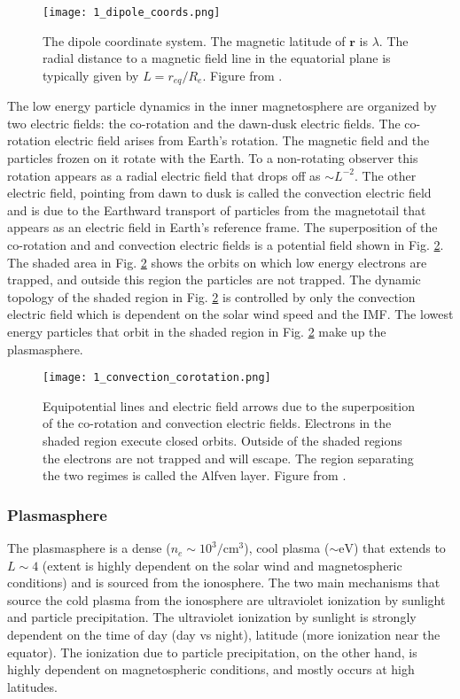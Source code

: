 \begin{figure}
\texttt{[image: 1\_dipole\_coords.png]}
\caption{The dipole coordinate system. The magnetic latitude of $\mathbf{r}$ is $\lambda$. The radial distance to a magnetic field line in the equatorial plane is typically given by $L = r_{eq}/R_e$. Figure from \citet{Baumjohann1997}.}
\label{Intro:dipole_coords}
\end{figure}


The low energy particle dynamics in the inner magnetosphere are organized by two electric fields: the co-rotation and the dawn-dusk electric fields. The co-rotation electric field arises from Earth's rotation. The magnetic field and the particles frozen on it rotate with the Earth. To a non-rotating observer this rotation appears as a radial electric field that drops off as $\sim L^{-2}$. The other electric field, pointing from dawn to dusk is called the convection electric field and is due to the Earthward transport of particles from the magnetotail that appears as an electric field in Earth's reference frame. The superposition of the co-rotation and and convection electric fields is a potential field shown in Fig. \ref{Intro:E_fields}. The shaded area in Fig. \ref{Intro:E_fields} shows the orbits on which low energy electrons are trapped, and outside this region the particles are not trapped. The dynamic topology of the shaded region in Fig. \ref{Intro:E_fields} is controlled by only the convection electric field which is dependent on the solar wind speed and the IMF. The lowest energy particles that orbit in the shaded region in Fig. \ref{Intro:E_fields} make up the plasmasphere.

\begin{figure}
\texttt{[image: 1\_convection\_corotation.png]}
\caption{Equipotential lines and electric field arrows due to the superposition of the co-rotation and convection electric fields. Electrons in the shaded region execute closed orbits. Outside of the shaded regions the electrons are not trapped and will escape. The region separating the two regimes is called the Alfven layer. Figure from \citet{Baumjohann1997}.}
\label{Intro:E_fields}
\end{figure}

\subsubsection{Plasmasphere}
The plasmasphere is a dense ($n_e \sim 10^3/\mathrm{cm}^3$), cool plasma ($\sim \mathrm{eV}$) that extends to $L \sim 4$ (extent is highly dependent on the solar wind and magnetospheric conditions) and is sourced from the ionosphere. The two main mechanisms that source the cold plasma from the ionosphere are ultraviolet ionization by sunlight and particle precipitation. The ultraviolet ionization by sunlight is strongly dependent on the time of day (day vs night), latitude (more ionization near the equator). The ionization due to particle precipitation, on the other hand, is highly dependent on magnetospheric conditions, and mostly occurs at high latitudes.

